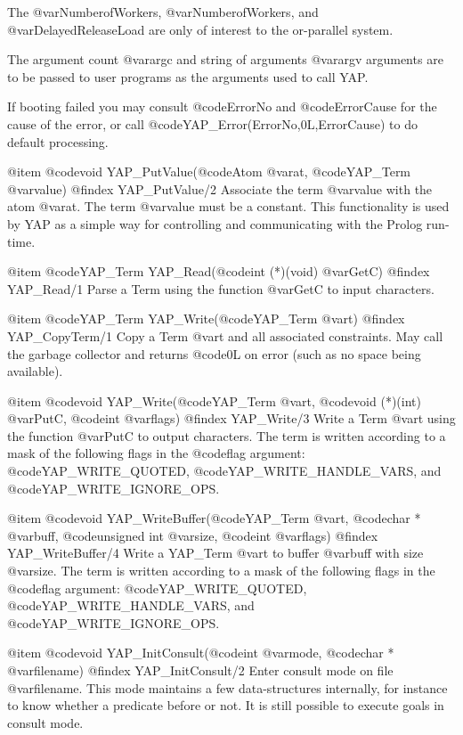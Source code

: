 {{{{{{{{{The @var{NumberofWorkers}, @var{NumberofWorkers}, and
@var{DelayedReleaseLoad} are only of interest to the or-parallel system.

The argument count @var{argc} and string of arguments @var{argv}
arguments are to be passed to user programs as the arguments used to
call YAP.

If booting failed you may consult @code{ErrorNo} and @code{ErrorCause}
for the cause of the error, or call
@code{YAP_Error(ErrorNo,0L,ErrorCause)} to do default processing. 


@item  @code{void} YAP_PutValue(@code{Atom} @var{at}, @code{YAP_Term} @var{value})
@findex  YAP_PutValue/2
Associate the term @var{value} with the atom @var{at}. The term
@var{value} must be a constant. This functionality is used by YAP as a
simple way for controlling and communicating with the Prolog run-time.

@item  @code{YAP_Term} YAP_Read(@code{int (*)(void)} @var{GetC})
@findex  YAP_Read/1
Parse a Term  using the function @var{GetC} to input characters.

@item  @code{YAP_Term} YAP_Write(@code{YAP_Term} @var{t})
@findex  YAP_CopyTerm/1
Copy a Term @var{t} and all associated constraints. May call the garbage
collector and returns @code{0L} on error (such as no space being
available).

@item  @code{void} YAP_Write(@code{YAP_Term} @var{t}, @code{void (*)(int)}
@var{PutC}, @code{int} @var{flags})
@findex  YAP_Write/3
Write a Term @var{t} using the function @var{PutC} to output
characters. The term is written according to a mask of the following
flags in the @code{flag} argument: @code{YAP_WRITE_QUOTED},
@code{YAP_WRITE_HANDLE_VARS},  and @code{YAP_WRITE_IGNORE_OPS}.

@item  @code{void} YAP_WriteBuffer(@code{YAP_Term} @var{t}, @code{char *}
@var{buff}, @code{unsigned int}
@var{size}, @code{int} @var{flags})
@findex  YAP_WriteBuffer/4
Write a YAP_Term @var{t} to buffer @var{buff} with size @var{size}. The
term is written according to a mask of the following flags in the
@code{flag} argument: @code{YAP_WRITE_QUOTED},
@code{YAP_WRITE_HANDLE_VARS}, and @code{YAP_WRITE_IGNORE_OPS}.

@item  @code{void} YAP_InitConsult(@code{int} @var{mode}, @code{char *} @var{filename})
@findex YAP_InitConsult/2
Enter consult mode on file @var{filename}. This mode maintains a few
data-structures internally, for instance to know whether a predicate
before or not. It is still possible to execute goals in consult mode.

}}}}}}}}}

